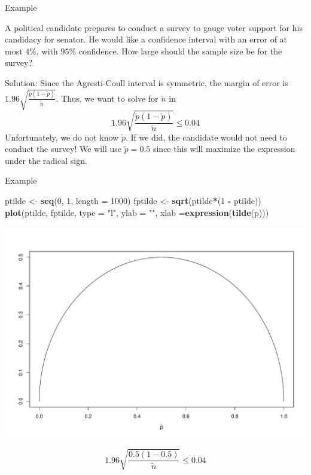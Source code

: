 \documentclass[
  ignorenonframetext,
]{beamer}
\newenvironment{Shaded}{\begin{snugshade}}{\end{snugshade}}
\newcommand{\AttributeTok}[1]{\textcolor[rgb]{0.13,0.29,0.53}{#1}}
\newcommand{\DecValTok}[1]{\textcolor[rgb]{0.00,0.00,0.81}{#1}}
\newcommand{\FunctionTok}[1]{\textcolor[rgb]{0.13,0.29,0.53}{\textbf{#1}}}
\newcommand{\NormalTok}[1]{#1}
\newcommand{\OtherTok}[1]{\textcolor[rgb]{0.56,0.35,0.01}{#1}}
\newcommand{\SpecialCharTok}[1]{\textcolor[rgb]{0.81,0.36,0.00}{\textbf{#1}}}
\newcommand{\StringTok}[1]{\textcolor[rgb]{0.31,0.60,0.02}{#1}}
\begin{document}
\begin{frame}{Example}
\protect\hypertarget{example}{}
\begin{tcolorbox}
A political candidate prepares to conduct a survey to gauge voter support for his candidacy for senator. He would like a confidence interval with an error of at most $4\%$, with $95\%$ confidence. How large should the sample size be for the survey? 
\end{tcolorbox}

\begin{tcolorbox}
Solution:  Since the Agresti-Coull interval is symmetric, the margin of error is $1.96\sqrt{\frac{\tilde{p}(1-\tilde{p})}{\tilde{n}}}$. Thus, we want to solve for $\tilde{n}$ in 
$$1.96\sqrt{\frac{\tilde{p}(1-\tilde{p})}{\tilde{n}}}\leq 0.04$$
Unfortunately, we do not know $\tilde{p}$. If we did, the candidate would not need to conduct the survey! We will use $\tilde{p}=0.5$ since this will maximize the expression under the radical sign. 

\end{tcolorbox}
\end{frame}

\begin{frame}[fragile]{Example}
\protect\hypertarget{example-3}{}
\tiny

\begin{Shaded}
\begin{Highlighting}[]
\NormalTok{ptilde }\OtherTok{\textless{}{-}} \FunctionTok{seq}\NormalTok{(}\DecValTok{0}\NormalTok{, }\DecValTok{1}\NormalTok{, }\AttributeTok{length =} \DecValTok{1000}\NormalTok{)}
\NormalTok{fptilde }\OtherTok{\textless{}{-}} \FunctionTok{sqrt}\NormalTok{(ptilde}\SpecialCharTok{*}\NormalTok{(}\DecValTok{1} \SpecialCharTok{{-}}\NormalTok{ ptilde))}
\FunctionTok{plot}\NormalTok{(ptilde, fptilde, }\AttributeTok{type =} \StringTok{"l"}\NormalTok{, }\AttributeTok{ylab =} \StringTok{""}\NormalTok{, }\AttributeTok{xlab =}\FunctionTok{expression}\NormalTok{(}\FunctionTok{tilde}\NormalTok{(p)))}
\end{Highlighting}
\end{Shaded}

\begin{center}\includegraphics[width=0.6\linewidth,height=0.4\textheight]{Week11_12_13_files/figure-beamer/unnamed-chunk-12-1} \end{center}
\normalsize

\[1.96\sqrt{\frac{0.5(1-0.5)}{\tilde{n}}}\leq 0.04\]
\end{frame}
\end{document}
